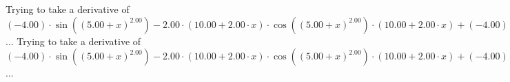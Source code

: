 \documentclass{article}
\begin{document}
 \newline
 \newline 
Trying to take a derivative of ${{{{\left({-4.00}\right) \cdot  \sin {\left({\left({{5.00} + {x}}\right) ^ {2.00}}\right)} } - {{2.00} \cdot {\left({{10.00} + {{2.00} \cdot {x}}}\right) \cdot { \cos {\left({\left({{5.00} + {x}}\right) ^ {2.00}}\right)}  \cdot \left({{10.00} + {{2.00} \cdot {x}}}\right)}}}} + {{{\left({-4.00}\right) \cdot  \sin {\left({\left({{5.00} + {x}}\right) ^ {2.00}}\right)} } - {{2.00} \cdot {\left({{10.00} + {{2.00} \cdot {x}}}\right) \cdot { \cos {\left({\left({{5.00} + {x}}\right) ^ {2.00}}\right)}  \cdot \left({{10.00} + {{2.00} \cdot {x}}}\right)}}}} - {\left({{10.00} + {{2.00} \cdot {x}}}\right) \cdot \left({{{2.00} \cdot { \cos {\left({\left({{5.00} + {x}}\right) ^ {2.00}}\right)}  \cdot \left({{10.00} + {{2.00} \cdot {x}}}\right)}} + {{{2.00} \cdot { \cos {\left({\left({{5.00} + {x}}\right) ^ {2.00}}\right)}  \cdot \left({{10.00} + {{2.00} \cdot {x}}}\right)}} + {\left({{10.00} + {{2.00} \cdot {x}}}\right) \cdot \left({{\left({-1.00}\right) \cdot {\left({{10.00} + {{2.00} \cdot {x}}}\right) \cdot {\left({{10.00} + {{2.00} \cdot {x}}}\right) \cdot  \sin {\left({\left({{5.00} + {x}}\right) ^ {2.00}}\right)} }}} + {{2.00} \cdot  \cos {\left({\left({{5.00} + {x}}\right) ^ {2.00}}\right)} }}\right)}}}\right)}}} + {{\left({-4.00}\right) \cdot  \sin {\left({\left({{5.00} + {x}}\right) ^ {2.00}}\right)} } - {{2.00} \cdot {\left({{10.00} + {{2.00} \cdot {x}}}\right) \cdot { \cos {\left({\left({{5.00} + {x}}\right) ^ {2.00}}\right)}  \cdot \left({{10.00} + {{2.00} \cdot {x}}}\right)}}}}}$...\newline
\newline
Trying to take a derivative of ${{{\left({-4.00}\right) \cdot  \sin {\left({\left({{5.00} + {x}}\right) ^ {2.00}}\right)} } - {{2.00} \cdot {\left({{10.00} + {{2.00} \cdot {x}}}\right) \cdot { \cos {\left({\left({{5.00} + {x}}\right) ^ {2.00}}\right)}  \cdot \left({{10.00} + {{2.00} \cdot {x}}}\right)}}}} + {{{\left({-4.00}\right) \cdot  \sin {\left({\left({{5.00} + {x}}\right) ^ {2.00}}\right)} } - {{2.00} \cdot {\left({{10.00} + {{2.00} \cdot {x}}}\right) \cdot { \cos {\left({\left({{5.00} + {x}}\right) ^ {2.00}}\right)}  \cdot \left({{10.00} + {{2.00} \cdot {x}}}\right)}}}} - {\left({{10.00} + {{2.00} \cdot {x}}}\right) \cdot \left({{{2.00} \cdot { \cos {\left({\left({{5.00} + {x}}\right) ^ {2.00}}\right)}  \cdot \left({{10.00} + {{2.00} \cdot {x}}}\right)}} + {{{2.00} \cdot { \cos {\left({\left({{5.00} + {x}}\right) ^ {2.00}}\right)}  \cdot \left({{10.00} + {{2.00} \cdot {x}}}\right)}} + {\left({{10.00} + {{2.00} \cdot {x}}}\right) \cdot \left({{\left({-1.00}\right) \cdot {\left({{10.00} + {{2.00} \cdot {x}}}\right) \cdot {\left({{10.00} + {{2.00} \cdot {x}}}\right) \cdot  \sin {\left({\left({{5.00} + {x}}\right) ^ {2.00}}\right)} }}} + {{2.00} \cdot  \cos {\left({\left({{5.00} + {x}}\right) ^ {2.00}}\right)} }}\right)}}}\right)}}}$...\newline
\end{document}
